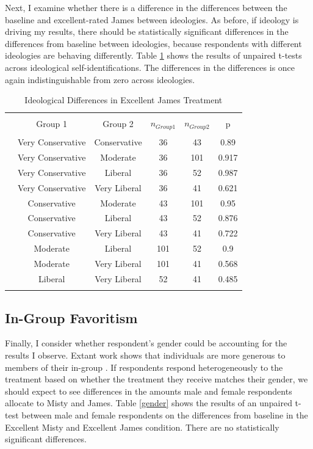 \documentclass[12pt]{article}%
\begin{document}
\begin{doublespace}
Next, I examine whether there is a difference in the differences between the baseline and excellent-rated James between ideologies. As before, if ideology is driving my results, there should be statistically significant differences in the differences from baseline between ideologies, because respondents with different ideologies are behaving differently. Table \ref{ideo-james} shows the results of unpaired t-tests across ideological self-identifications. The differences in the differences is once again indistinguishable from zero across ideologies.

\begin{table}[!htbp] \centering 
	\caption{Ideological Differences in Excellent James Treatment} 
	\label{ideo-james} 
	\begin{tabular}{@{\extracolsep{5pt}} cccccc} 
		\\[-1.8ex]\hline 
		\hline \\[-1.8ex] 
		& Group 1 & Group 2 & $n_{Group 1}$ & $n_{Group 2}$ & p \\ 
		\hline \\[-1.8ex] 
		 & Very Conservative & Conservative & 36 & 43 & 0.89 \\ 
		 & Very Conservative & Moderate & 36 & 101 & 0.917 \\ 
		 & Very Conservative & Liberal & 36 & 52 & 0.987 \\ 
		 & Very Conservative & Very Liberal & 36 & 41 & 0.621 \\ 
		 & Conservative & Moderate & 43 & 101 & 0.95 \\ 
		 & Conservative & Liberal & 43 & 52 & 0.876 \\ 
		 & Conservative & Very Liberal & 43 & 41 & 0.722 \\ 
		 & Moderate & Liberal & 101 & 52 & 0.9 \\ 
		 & Moderate & Very Liberal & 101 & 41 & 0.568 \\ 
		 & Liberal & Very Liberal & 52 & 41 & 0.485 \\ 
		\hline \\[-1.8ex] 
	\end{tabular} 
\end{table} 

\subsection*{In-Group Favoritism}
Finally, I consider whether respondent's gender could be accounting for the results I observe. Extant work shows that individuals are more generous to members of their in-group \citep{chen2009group}. If respondents respond heterogeneously to the treatment based on whether the treatment they receive matches their gender, we should expect to see differences in the amounts male and female respondents allocate to Misty and James. Table \ref{gender} shows the results of an unpaired t-test between male and female respondents on the differences from baseline in the Excellent Misty and Excellent James condition. There are no statistically significant differences.


\end{doublespace}
\end{document}

